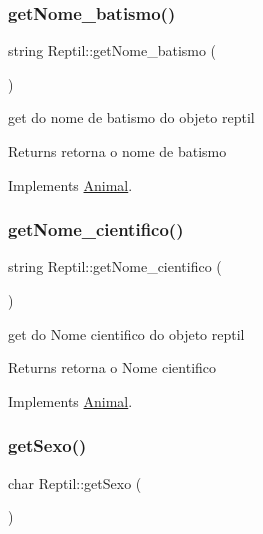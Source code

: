 \subsubsection{\texorpdfstring{getNome\_batismo()}{getNome\_batismo()}}
{\footnotesize\ttfamily string Reptil\+::get\+Nome\+\_\+batismo (\begin{DoxyParamCaption}{ }\end{DoxyParamCaption})\hspace{0.3cm}{\ttfamily [virtual]}}



get do nome de batismo do objeto reptil 

\begin{DoxyReturn}{Returns}
retorna o nome de batismo 
\end{DoxyReturn}


Implements \mbox{\hyperlink{class_animal}{Animal}}.

\mbox{\label{class_reptil_ae47155ed3aec72c48b1c8b2d9706e3cc}} 
\subsubsection{\texorpdfstring{getNome\_cientifico()}{getNome\_cientifico()}}
{\footnotesize\ttfamily string Reptil\+::get\+Nome\+\_\+cientifico (\begin{DoxyParamCaption}{ }\end{DoxyParamCaption})\hspace{0.3cm}{\ttfamily [virtual]}}



get do Nome cientifico do objeto reptil 

\begin{DoxyReturn}{Returns}
retorna o Nome cientifico 
\end{DoxyReturn}


Implements \mbox{\hyperlink{class_animal}{Animal}}.

\mbox{\label{class_reptil_a60ecd7678f73c51cab6deededd12d957}} 
\subsubsection{\texorpdfstring{getSexo()}{getSexo()}}
{\footnotesize\ttfamily char Reptil\+::get\+Sexo (\begin{DoxyParamCaption}{ }\end{DoxyParamCaption})\hspace{0.3cm}{\ttfamily [virtual]}}



